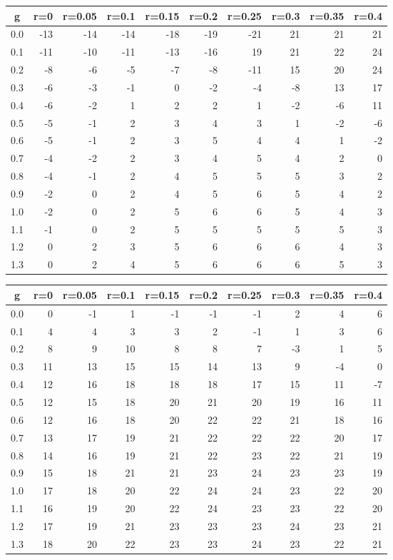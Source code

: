 %
\begin{table}[!tbp]
 \begin{center}
 \begin{tabular}{rrrrrrrrrr}\hline\hline
\multicolumn{1}{c}{g}&\multicolumn{1}{c}{r=0}&\multicolumn{1}{c}{r=0.05}&\multicolumn{1}{c}{r=0.1}&\multicolumn{1}{c}{r=0.15}&\multicolumn{1}{c}{r=0.2}&\multicolumn{1}{c}{r=0.25}&\multicolumn{1}{c}{r=0.3}&\multicolumn{1}{c}{r=0.35}&\multicolumn{1}{c}{r=0.4}\tabularnewline
\hline
0.0&-13&-14&-14&-18&-19&-21&21&21&21\tabularnewline
0.1&-11&-10&-11&-13&-16& 19&21&22&24\tabularnewline
0.2& -8& -6& -5& -7& -8&-11&15&20&24\tabularnewline
0.3& -6& -3& -1&  0& -2& -4&-8&13&17\tabularnewline
0.4& -6& -2&  1&  2&  2&  1&-2&-6&11\tabularnewline
0.5& -5& -1&  2&  3&  4&  3& 1&-2&-6\tabularnewline
0.6& -5& -1&  2&  3&  5&  4& 4& 1&-2\tabularnewline
0.7& -4& -2&  2&  3&  4&  5& 4& 2& 0\tabularnewline
0.8& -4& -1&  2&  4&  5&  5& 5& 3& 2\tabularnewline
0.9& -2&  0&  2&  4&  5&  6& 5& 4& 2\tabularnewline
1.0& -2&  0&  2&  5&  6&  6& 5& 4& 3\tabularnewline
1.1& -1&  0&  2&  5&  5&  5& 5& 5& 3\tabularnewline
1.2&  0&  2&  3&  5&  6&  6& 6& 4& 3\tabularnewline
1.3&  0&  2&  4&  5&  6&  6& 6& 5& 3\tabularnewline
\hline
\end{tabular}

\end{center}

\end{table}

%
\begin{table}[!tbp]
 \begin{center}
 \begin{tabular}{rrrrrrrrrr}\hline\hline
\multicolumn{1}{c}{g}&\multicolumn{1}{c}{r=0}&\multicolumn{1}{c}{r=0.05}&\multicolumn{1}{c}{r=0.1}&\multicolumn{1}{c}{r=0.15}&\multicolumn{1}{c}{r=0.2}&\multicolumn{1}{c}{r=0.25}&\multicolumn{1}{c}{r=0.3}&\multicolumn{1}{c}{r=0.35}&\multicolumn{1}{c}{r=0.4}\tabularnewline
\hline
0.0& 0&-1& 1&-1&-1&-1& 2& 4& 6\tabularnewline
0.1& 4& 4& 3& 3& 2&-1& 1& 3& 6\tabularnewline
0.2& 8& 9&10& 8& 8& 7&-3& 1& 5\tabularnewline
0.3&11&13&15&15&14&13& 9&-4& 0\tabularnewline
0.4&12&16&18&18&18&17&15&11&-7\tabularnewline
0.5&12&15&18&20&21&20&19&16&11\tabularnewline
0.6&12&16&18&20&22&22&21&18&16\tabularnewline
0.7&13&17&19&21&22&22&22&20&17\tabularnewline
0.8&14&16&19&21&22&23&22&21&19\tabularnewline
0.9&15&18&21&21&23&24&23&23&19\tabularnewline
1.0&17&18&20&22&24&24&23&22&20\tabularnewline
1.1&16&19&20&22&24&23&23&22&20\tabularnewline
1.2&17&19&21&23&23&23&24&23&21\tabularnewline
1.3&18&20&22&23&23&24&23&22&21\tabularnewline
\hline
\end{tabular}

\end{center}

\end{table}

